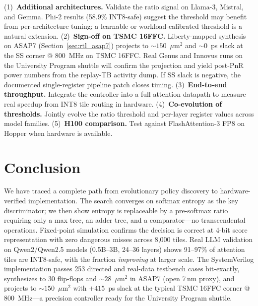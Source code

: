 \documentclass[10pt,twocolumn]{article}
\begin{document}
(1)~\textbf{Additional architectures.}
Validate the ratio signal on Llama-3, Mistral, and Gemma. Phi-2
results (58.9\% INT8-safe) suggest the threshold may benefit from
per-architecture tuning; a learnable or workload-calibrated threshold
is a natural extension.
(2)~\textbf{Sign-off on TSMC 16FFC.}
Liberty-mapped synthesis on ASAP7 (Section~\ref{sec:rtl_asap7})
projects to $\sim\!150$~$\mu$m$^2$ and $\sim\!0$~ps slack at the SS
corner @ 800~MHz on TSMC 16FFC. Real Genus and Innovus runs on the
University Program shuttle will confirm the projection and yield
post-PnR power numbers from the replay-TB activity dump. If SS slack is
negative, the documented single-register pipeline patch closes
timing.
(3)~\textbf{End-to-end throughput.}
Integrate the controller into a full attention datapath to measure
real speedup from INT8 tile routing in hardware.
(4)~\textbf{Co-evolution of thresholds.}
Jointly evolve the ratio threshold and per-layer register values
across model families.
(5)~\textbf{H100 comparison.}
Test against FlashAttention-3 FP8 on Hopper when hardware is available.

\section{Conclusion}

We have traced a complete path from evolutionary policy discovery to
hardware-verified implementation. The search converges on softmax
entropy as the key discriminator; we then show entropy is replaceable
by a pre-softmax ratio requiring only a max tree, an adder tree, and
a comparator---no transcendental operations. Fixed-point simulation
confirms the decision is correct at 4-bit score representation with
zero dangerous misses across 8{,}000 tiles. Real LLM validation on
Qwen2/Qwen2.5 models (0.5B--3B, 24--36 layers) shows 91--97\% of
attention tiles are INT8-safe, with the fraction \emph{improving} at
larger scale. The SystemVerilog implementation passes 253 directed and
real-data testbench cases bit-exactly, synthesizes to $30$ flip-flops
and $\sim\!28$~$\mu$m$^2$ in ASAP7 (open 7\,nm proxy), and projects to
$\sim\!150$~$\mu$m$^2$ with $+415$~ps slack at the typical TSMC 16FFC
corner @ 800~MHz---a precision controller ready for the University
Program shuttle.



\end{document}
